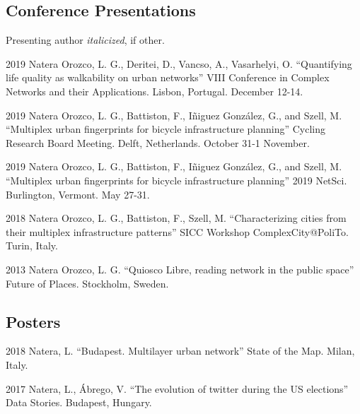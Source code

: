 \documentclass{academiccv}
\begin{document}
\subsection*{Conference Presentations}
Presenting author \textit{italicized}, if other.\bigskip
\begin{tablist}
	\item[2019] \tab Natera Orozco, L. G., Deritei, D., Vancso, A., Vasarhelyi, O. \enquote{Quantifying life quality as walkability on urban networks} VIII Conference in Complex Networks and their Applications. Lisbon, Portugal. December 12-14.
	\item[2019] \tab Natera Orozco, L. G., Battiston, F., Iñiguez González, G., and Szell, M. \enquote{Multiplex urban fingerprints for bicycle infrastructure planning} Cycling Research Board Meeting. Delft, Netherlands. October 31-1 November.
	\item[2019] \tab Natera Orozco, L. G., Battiston, F., Iñiguez González, G., and Szell, M. \enquote{Multiplex urban fingerprints for bicycle infrastructure planning} 2019 NetSci. Burlington, Vermont. May 27-31.
	\item[2018] \tab Natera Orozco, L. G., Battiston, F., Szell, M. \enquote{Characterizing cities from their multiplex infrastructure patterns} SICC Workshop ComplexCity@PoliTo. Turin, Italy.
	\item[2013] \tab Natera Orozco, L. G. \enquote{Quiosco Libre, reading network in the public space} Future of Places. Stockholm, Sweden.
\end{tablist}

\subsection*{Posters}
\begin{tablist}
	\item[2018] \tab Natera, L. \enquote{Budapest. Multilayer urban network} State of the Map. Milan, Italy.
	\item[2017] \tab Natera, L., Ábrego, V. \enquote{The evolution of twitter during the US elections} Data Stories. Budapest, Hungary.
\end{tablist}
\end{document}
